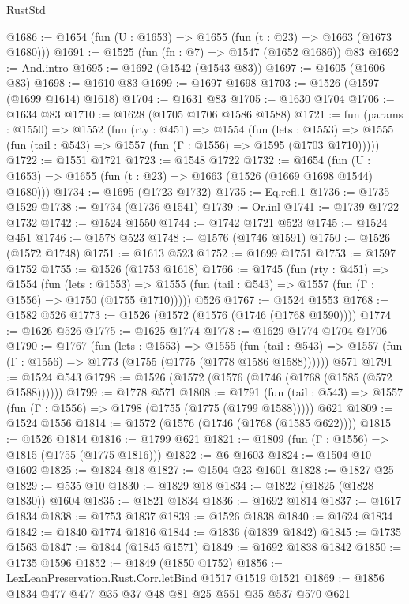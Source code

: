 \begin{lexlean}{RustStd}
\begin{coremodule}
@1686 := @1654 (fun (U : @1653) => @1655 (fun (t : @23) => @1663 (@1673 @1680)))
@1691 := @1525 (fun (fn : @7) => @1547 (@1652 @1686)) @83
@1692 := And.intro
@1695 := @1692 (@1542 (@1543 @83))
@1697 := @1605 (@1606 @83)
@1698 := @1610 @83
@1699 := @1697 @1698
@1703 := @1526 (@1597 (@1699 @1614) @1618)
@1704 := @1631 @83
@1705 := @1630 @1704
@1706 := @1634 @83
@1710 := @1628 (@1705 @1706 @1586 @1588)
@1721 := fun (params : @1550) =>
  @1552
    (fun (rty : @451) =>
    @1554
      (fun (lets : @1553) =>
      @1555 (fun (tail : @543) => @1557 (fun (Γ : @1556) => @1595 (@1703 @1710)))))
@1722 := @1551 @1721
@1723 := @1548 @1722
@1732 := @1654 (fun (U : @1653) => @1655 (fun (t : @23) => @1663 (@1526 (@1669 @1698 @1544) @1680)))
@1734 := @1695 (@1723 @1732)
@1735 := Eq.refl.{1}
@1736 := @1735 @1529
@1738 := @1734 (@1736 @1541)
@1739 := Or.inl
@1741 := @1739 @1722 @1732
@1742 := @1524 @1550
@1744 := @1742 @1721 @523
@1745 := @1524 @451
@1746 := @1578 @523
@1748 := @1576 (@1746 @1591)
@1750 := @1526 (@1572 @1748)
@1751 := @1613 @523
@1752 := @1699 @1751
@1753 := @1597 @1752
@1755 := @1526 (@1753 @1618)
@1766 := @1745
    (fun (rty : @451) =>
    @1554
      (fun (lets : @1553) =>
      @1555 (fun (tail : @543) => @1557 (fun (Γ : @1556) => @1750 (@1755 @1710)))))
    @526
@1767 := @1524 @1553
@1768 := @1582 @526
@1773 := @1526 (@1572 (@1576 (@1746 (@1768 @1590))))
@1774 := @1626 @526
@1775 := @1625 @1774
@1778 := @1629 @1774 @1704 @1706
@1790 := @1767
    (fun (lets : @1553) =>
    @1555
      (fun (tail : @543) => @1557 (fun (Γ : @1556) => @1773 (@1755 (@1775 (@1778 @1586 @1588))))))
    @571
@1791 := @1524 @543
@1798 := @1526 (@1572 (@1576 (@1746 (@1768 (@1585 (@572 @1588))))))
@1799 := @1778 @571
@1808 := @1791
    (fun (tail : @543) => @1557 (fun (Γ : @1556) => @1798 (@1755 (@1775 (@1799 @1588)))))
    @621
@1809 := @1524 @1556
@1814 := @1572 (@1576 (@1746 (@1768 (@1585 @622))))
@1815 := @1526 @1814
@1816 := @1799 @621
@1821 := @1809 (fun (Γ : @1556) => @1815 (@1755 (@1775 @1816)))
@1822 := @6 @1603
@1824 := @1504 @10 @1602
@1825 := @1824 @18
@1827 := @1504 @23 @1601
@1828 := @1827 @25
@1829 := @535 @10
@1830 := @1829 @18
@1834 := @1822 (@1825 (@1828 @1830)) @1604
@1835 := @1821 @1834
@1836 := @1692 @1814
@1837 := @1617 @1834
@1838 := @1753 @1837
@1839 := @1526 @1838
@1840 := @1624 @1834
@1842 := @1840 @1774 @1816
@1844 := @1836 (@1839 @1842)
@1845 := @1735 @1563
@1847 := @1844 (@1845 @1571)
@1849 := @1692 @1838 @1842
@1850 := @1735 @1596
@1852 := @1849 (@1850 @1752)
@1856 := LexLeanPreservation.Rust.Corr.letBind @1517 @1519 @1521
@1869 := @1856 @1834 @477 @477 @35 @37 @48 @81 @25 @551 @35 @537 @570 @621

\end{coremodule}
\end{lexlean}
